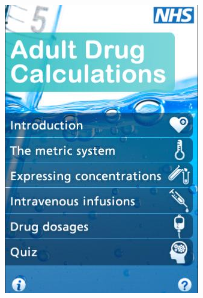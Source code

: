 \documentclass{l3proj}
\begin{document}
\begin{figure}[!htb]
  \includegraphics[width=\linewidth]{images/NHSDrugApp/NHSDrugApp2.png}
\endminipage\hfill
{}

\end{figure}
\end{document}
